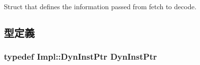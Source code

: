 Struct that defines the information passed from fetch to decode. 

\subsection{型定義}
\hypertarget{structDefaultFetchDefaultDecode_a028ce10889c5f6450239d9e9a7347976}{
\subsubsection[{DynInstPtr}]{\setlength{\rightskip}{0pt plus 5cm}typedef Impl::DynInstPtr {\bf DynInstPtr}}}
\label{structDefaultFetchDefaultDecode_a028ce10889c5f6450239d9e9a7347976}


